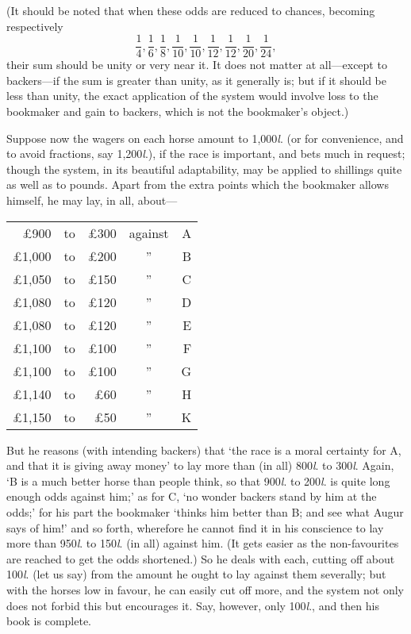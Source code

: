 \documentclass[letterpaper,12pt,oneside,openany]{memoir}
\begin{document}
(It should be noted that when these odds are reduced
to chances, becoming respectively
\[
\frac{1}{4}, \frac{1}{6}, \frac{1}{8}, \frac{1}{10}, \frac{1}{10},
\frac{1}{12}, \frac{1}{12}, \frac{1}{20}, \frac{1}{24},
\]
their sum should be unity or very near it. It does not
matter at all---except to backers---if the sum is greater
than unity, as it generally is; but if it should be less
than unity, the exact application of the system would
involve loss to the bookmaker and gain to backers,
which is not the bookmaker's object.)

Suppose now the wagers on each horse amount to
1,000\textit{l}. (or for convenience, and to avoid fractions, say
1,200\textit{l}.), if the race is important, and bets much in
request; though the system, in its beautiful adaptability,
may be applied to shillings quite as well as to
pounds.
Apart from the extra points which the bookmaker
allows himself, he may lay, in all, about---

\begin{center}
\begin{tabular}{rcrcr}
\pounds 900   &to &\pounds 300  &against &A\\
\pounds 1,000 &to &\pounds 200  &''  &B\\
\pounds 1,050 &to &\pounds 150  &''  &C\\
\pounds 1,080 &to &\pounds 120  &''  &D\\
\pounds 1,080 &to &\pounds 120  &''  &E\\
\pounds 1,100 &to &\pounds 100  &''  &F\\
\pounds 1,100 &to &\pounds 100  &''  &G\\
\pounds 1,140 &to &\pounds 60   &''  &H\\
\pounds 1,150 &to &\pounds 50   &''  &K
\end{tabular}
\end{center}

But he reasons (with intending backers) that `the race
is a moral certainty for A, and that it is giving away
money' to lay more than (in all) 800\textit{l}. to 300\textit{l}. Again, `B
is a much better horse than people think, so that 900\textit{l}.
to 200\textit{l}. is quite long enough odds against him;' as for C,
`no wonder backers stand by him at the odds;' for his
part the bookmaker `thinks him better than B; and
see what Augur says of him!' and so forth, wherefore
he cannot find it in his conscience to lay more than
950\textit{l}. to 150\textit{l}. (in all) against him. (It gets easier as
the non-favourites are reached to get the odds shortened.)
So he deals with each, cutting off about 100\textit{l}.
(let us say) from the amount he ought to lay against
them severally; but with the horses low in favour, he
can easily cut off more, and the system not only does
not forbid this but encourages it. Say, however, only
100\textit{l}., and then his book is complete.
\end{document}

